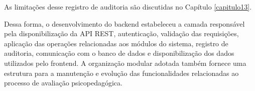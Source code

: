 As limitações desse registro de auditoria são discutidas no Capítulo \ref{capitulo13}.

Dessa forma, o desenvolvimento do backend estabeleceu a camada responsável pela disponibilização da API REST, autenticação, validação das requisições, aplicação das operações relacionadas aos módulos do sistema, registro de auditoria, comunicação com o banco de dados e disponibilização dos dados utilizados pelo frontend. A organização modular adotada também fornece uma estrutura para a manutenção e evolução das funcionalidades relacionadas ao processo de avaliação psicopedagógica.